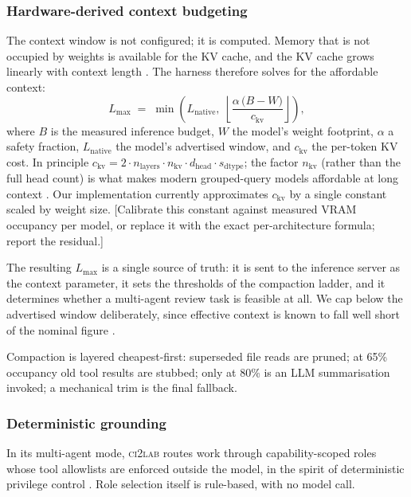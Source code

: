 \documentclass[11pt,a4paper]{article}
\newcommand{\note}[1]{\textcolor{red!70!black}{\small\textsf{[#1]}}}
\begin{document}
\subsubsection{Hardware-derived context budgeting}
\label{sec:system-context}

The context window is not configured; it is computed. Memory that is not occupied
by weights is available for the KV cache, and the KV cache grows linearly with
context length \citep{kwon2023pagedattention}. The harness therefore solves for
the affordable context:
\begin{equation}
  L_{\max} \;=\; \min\!\left(
    L_{\text{native}},\;
    \left\lfloor
      \frac{\alpha \,\bigl(B - W\bigr)}{c_{\mathrm{kv}}}
    \right\rfloor
  \right),
  \label{eq:ctx}
\end{equation}
where $B$ is the measured inference budget, $W$ the model's weight footprint,
$\alpha$ a safety fraction, $L_{\text{native}}$ the model's advertised window,
and $c_{\mathrm{kv}}$ the per-token KV cost. In principle
$c_{\mathrm{kv}} = 2 \cdot n_{\text{layers}} \cdot n_{\text{kv}} \cdot d_{\text{head}} \cdot s_{\text{dtype}}$;
the factor $n_{\text{kv}}$ (rather than the full head count) is what makes modern
grouped-query models affordable at long context \citep{ainslie2023gqa,shazeer2019mqa}.
Our implementation currently approximates $c_{\mathrm{kv}}$ by a single constant
scaled by weight size.
\note{Calibrate this constant against measured VRAM occupancy per model, or
replace it with the exact per-architecture formula; report the residual.}

The resulting $L_{\max}$ is a single source of truth: it is sent to the inference
server as the context parameter, it sets the thresholds of the compaction ladder,
and it determines whether a multi-agent review task is feasible at all. We cap
below the advertised window deliberately, since effective context is known to
fall well short of the nominal figure \citep{hsieh2024ruler,liu2024lost}.

Compaction is layered cheapest-first: superseded file reads are pruned; at 65\%
occupancy old tool results are stubbed; only at 80\% is an LLM summarisation
invoked; a mechanical trim is the final fallback.

\subsubsection{Deterministic grounding}
\label{sec:system-grounding}

In its multi-agent mode, \textsc{ci2lab} routes work through capability-scoped
roles whose tool allowlists are enforced outside the model, in the spirit of
deterministic privilege control \citep{shi2025progent}. Role selection itself is
rule-based, with no model call.
\end{document}
